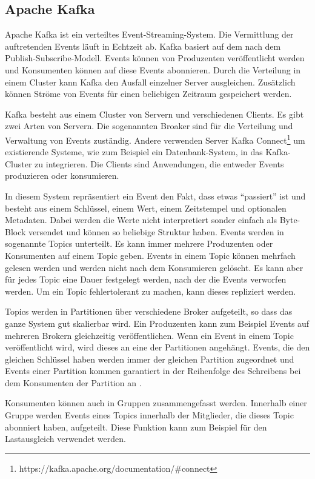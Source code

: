 \subsection{Apache Kafka}
\label{sec:kafka}

Apache Kafka ist ein verteiltes Event-Streaming-System.
Die Vermittlung der auftretenden Events läuft in Echtzeit ab.
Kafka basiert auf dem nach dem Publish-Subscribe-Modell.
Events können von Produzenten veröffentlicht werden und Konsumenten können auf diese Events abonnieren.
Durch die Verteilung in einem Cluster kann Kafka den Ausfall einzelner Server ausgleichen.
Zusätzlich können Ströme von Events für einen beliebigen Zeitraum gespeichert werden.

Kafka besteht aus einem Cluster von Servern und verschiedenen Clients.
Es gibt zwei Arten von Servern.
Die sogenannten Broaker sind für die Verteilung und Verwaltung von Events zuständig.
Andere verwenden Server Kafka Connect\footnote{https://kafka.apache.org/documentation/\#connect} um existierende Systeme, wie zum Beispiel ein Datenbank-System, in das Kafka-Cluster zu integrieren.
Die Clients sind Anwendungen, die entweder Events produzieren oder konsumieren.

In diesem System repräsentiert ein Event den Fakt, dass etwas "`passiert"' ist und besteht aus einem Schlüssel, einem Wert, einem Zeitstempel und optionalen Metadaten.
Dabei werden die Werte nicht interpretiert sonder einfach als Byte-Block versendet und können so beliebige Struktur haben.
Events werden in sogenannte Topics unterteilt.
Es kann immer mehrere Produzenten oder Konsumenten auf einem Topic geben.
Events in einem Topic können mehrfach gelesen werden und werden nicht nach dem Konsumieren gelöscht.
Es kann aber für jedes Topic eine Dauer festgelegt werden, nach der die Events verworfen werden.
Um ein Topic fehlertolerant zu machen, kann dieses repliziert werden.

Topics werden in Partitionen über verschiedene Broker aufgeteilt, so dass das ganze System gut skalierbar wird.
Ein Produzenten kann zum Beispiel Events auf mehreren Brokern gleichzeitig veröffentlichen.
Wenn ein Event in einem Topic veröffentlicht wird, wird dieses an eine der Partitionen angehängt.
Events, die den gleichen Schlüssel haben werden immer der gleichen Partition zugeordnet und Events einer Partition kommen garantiert in der Reihenfolge des Schreibens bei dem Konsumenten der Partition an \parencite{kafka-docs}.

Konsumenten können auch in Gruppen zusammengefasst werden.
Innerhalb einer Gruppe werden Events eines Topics innerhalb der Mitglieder, die dieses Topic abonniert haben, aufgeteilt.
Diese Funktion kann zum Beispiel für den Lastausgleich verwendet werden.
